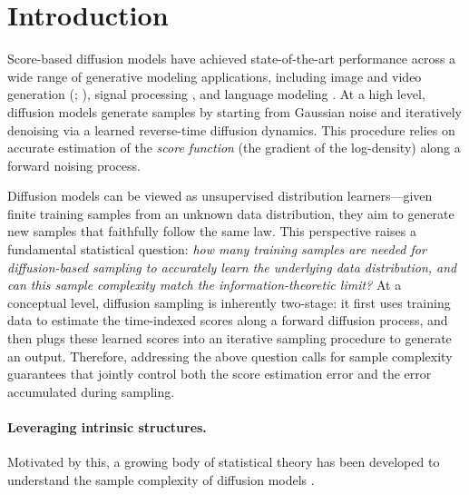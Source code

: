 \documentclass{article}
\theoremstyle{plain}
\theoremstyle{remark}
\begin{document}
\section{Introduction}
Score-based diffusion models \citep{sohldickstein2015deepunsupervisedlearningusing,song2020generativemodelingestimatinggradients} have achieved state-of-the-art performance across a wide range of generative modeling applications, including image and video generation (\citealp{ho2020denoisingdiffusionprobabilisticmodels}; \citealp{ho2022videodiffusionmodels}), signal processing \citep{song2022solvinginverseproblemsmedical}, and language modeling \citep{austin2023structureddenoisingdiffusionmodels,nie2025largelanguagediffusionmodels}.
At a high level, diffusion models generate samples by starting from Gaussian noise and iteratively denoising via a learned reverse-time diffusion dynamics. This procedure relies on accurate estimation of the \textit{score function} (the gradient of the log-density) along a forward noising process.

Diffusion models can be viewed as unsupervised distribution learners---given finite training samples from an unknown data distribution, they aim to generate new samples that faithfully follow the same law. 
This perspective raises a fundamental statistical question: 
\textit{how many training samples are needed for diffusion-based sampling to accurately learn the underlying data distribution, and can this sample complexity match the information-theoretic limit?}
At a conceptual level, diffusion sampling is inherently two-stage: it first uses training data to estimate the time-indexed scores along a forward diffusion process, and then plugs these learned scores into an iterative sampling procedure to generate an output.
Therefore, addressing the above question calls for sample complexity guarantees that jointly control 
both the score estimation error and the error accumulated during sampling.

\paragraph{Leveraging intrinsic structures.}
Motivated by this, a growing body of statistical theory has been developed to understand the sample complexity of diffusion models \citep{shah2023learning,oko2023diffusionmodelsminimaxoptimal,chen2024learning,cole2024score,li2024good,dou2024optimalscorematchingoptimal}.
\end{document}
